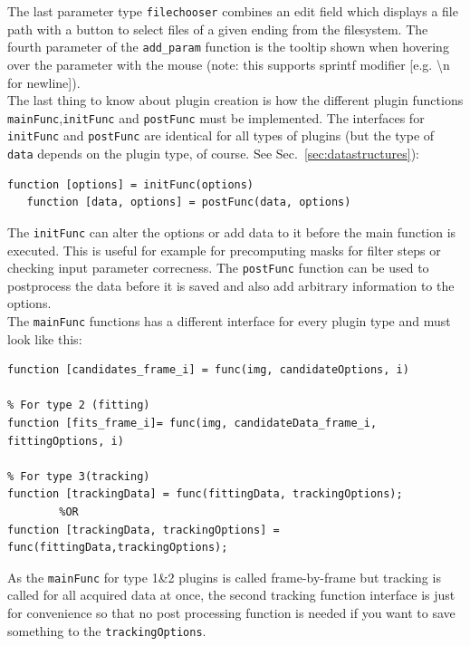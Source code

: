\documentclass[11pt,onside]{report}
\numberwithin{equation}{chapter}
\begin{document}
The last parameter type \texttt{filechooser} combines an edit field which displays a file path with a button to select files of a given ending from the filesystem. The fourth parameter of the \texttt{add\_param} function is the tooltip shown when hovering over the parameter with the mouse (note: this supports sprintf modifier [e.g. \textbackslash{}n for newline]). \\

The last thing to know about plugin creation is how the different plugin functions \texttt{mainFunc},\texttt{initFunc} and \texttt{postFunc} must be implemented. The interfaces for \texttt{initFunc} and \texttt{postFunc} are identical for all types of plugins (but the type of \texttt{data} depends on the plugin type, of course. See Sec.~\ref{sec:datastructures}):
\begin{lstlisting}[style=Matlab-editor]
   function [options] = initFunc(options)
   function [data, options] = postFunc(data, options)
\end{lstlisting}
The \texttt{initFunc} can alter the options or add data to it before the main function is executed. This is useful for example for precomputing masks for filter steps or checking input parameter correcness. The \texttt{postFunc} function can be used to postprocess the data before it is saved and also add arbitrary information to the options.\\

 The \texttt{mainFunc} functions has  a different interface for every plugin type and must look like this:
\begin{lstlisting}[style=Matlab-editor]
% For type 1 (candidate detection)
function [candidates_frame_i] = func(img, candidateOptions, i)
  
% For type 2 (fitting)
function [fits_frame_i]= func(img, candidateData_frame_i, fittingOptions, i)
  
% For type 3(tracking)
function [trackingData] = func(fittingData, trackingOptions);
        %OR
function [trackingData, trackingOptions] = func(fittingData,trackingOptions);
\end{lstlisting}
As the \texttt{mainFunc} for type 1\&2 plugins is called frame-by-frame but tracking is called for all acquired data at once, the second tracking function interface is just for convenience so that no post processing function is needed if you want to save something to the \texttt{trackingOptions}. \\
\end{document}
